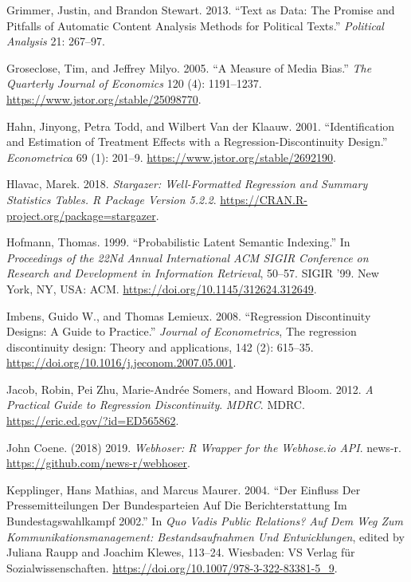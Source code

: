 \documentclass[
  12pt,
]{article}
\newlength{\cslhangindent}
\newlength{\cslentryspacingunit} %
\newenvironment{CSLReferences}[2] %
 {%
  \setlength{\parindent}{0pt}
  \ifodd #1
  \let\oldpar\par
  \def\par{\hangindent=\cslhangindent\oldpar}
  \fi
  \setlength{\parskip}{#2\cslentryspacingunit}
 }%
 {}
\begin{document}
\begin{CSLReferences}{1}{0}
\leavevmode{}%
Grimmer, Justin, and Brandon Stewart. 2013. {``Text as {Data}: {The
Promise} and {Pitfalls} of {Automatic Content Analysis Methods} for
{Political Texts}.''} \emph{Political Analysis} 21: 267--97.

\leavevmode{}%
Groseclose, Tim, and Jeffrey Milyo. 2005. {``A {Measure} of {Media
Bias}.''} \emph{The Quarterly Journal of Economics} 120 (4): 1191--1237.
\url{https://www.jstor.org/stable/25098770}.

\leavevmode{}%
Hahn, Jinyong, Petra Todd, and Wilbert Van der Klaauw. 2001.
{``Identification and {Estimation} of {Treatment Effects} with a
{Regression-Discontinuity Design}.''} \emph{Econometrica} 69 (1):
201--9. \url{https://www.jstor.org/stable/2692190}.

\leavevmode{}%
Hlavac, Marek. 2018. \emph{Stargazer: {Well-Formatted Regression} and
{Summary Statistics Tables}. {R} Package Version 5.2.2}.
\url{https://CRAN.R-project.org/package=stargazer}.

\leavevmode{}%
Hofmann, Thomas. 1999. {``Probabilistic {Latent Semantic Indexing}.''}
In \emph{Proceedings of the {22Nd Annual International ACM SIGIR
Conference} on {Research} and {Development} in {Information Retrieval}},
50--57. {SIGIR} '99. {New York, NY, USA}: {ACM}.
\url{https://doi.org/10.1145/312624.312649}.

\leavevmode{}%
Imbens, Guido W., and Thomas Lemieux. 2008. {``Regression Discontinuity
Designs: {A} Guide to Practice.''} \emph{Journal of Econometrics}, The
regression discontinuity design: {Theory} and applications, 142 (2):
615--35. \url{https://doi.org/10.1016/j.jeconom.2007.05.001}.

\leavevmode{}%
Jacob, Robin, Pei Zhu, Marie-Andrée Somers, and Howard Bloom. 2012.
\emph{A {Practical Guide} to {Regression Discontinuity}}. \emph{MDRC}.
{MDRC}. \url{https://eric.ed.gov/?id=ED565862}.

\leavevmode{}%
John Coene. (2018) 2019. \emph{Webhoser: {R} Wrapper for the Webhose.io
{API}}. {news-r}. \url{https://github.com/news-r/webhoser}.

\leavevmode{}%
Kepplinger, Hans Mathias, and Marcus Maurer. 2004. {``Der {Einfluss} Der
{Pressemitteilungen} Der {Bundesparteien} Auf Die {Berichterstattung} Im
{Bundestagswahlkampf} 2002.''} In \emph{Quo Vadis {Public Relations}?
{Auf} Dem {Weg} Zum {Kommunikationsmanagement}: {Bestandsaufnahmen} Und
{Entwicklungen}}, edited by Juliana Raupp and Joachim Klewes, 113--24.
{Wiesbaden}: {VS Verlag für Sozialwissenschaften}.
\url{https://doi.org/10.1007/978-3-322-83381-5_9}.


\end{CSLReferences}
\end{document}
